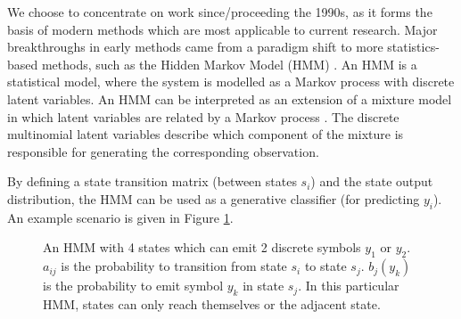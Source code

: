 \documentclass[12pt]{llncs}
\begin{document}
We choose to concentrate on work since/proceeding the 1990s, as it forms the basis of modern methods which are most applicable to current research. Major breakthroughs in early methods came from a paradigm shift to more statistics-based methods, such as the Hidden Markov Model (HMM) \cite{juang2005automatic}. An HMM is a statistical model, where the system is modelled as a Markov process with discrete latent variables. An HMM can be interpreted as an extension of a mixture model in which latent variables are related by a Markov process \cite{bishop2006pattern}. The discrete multinomial latent variables describe which component of the mixture is responsible for generating the corresponding observation.

By defining a state transition matrix (between states $s_i$) and the state output distribution, the HMM can be used as a generative classifier (for predicting $y_i$). An example scenario is given in Figure \ref{fig:HMM}.

\begin{figure}[htbp]
\begin{center}
\end{center}
\caption{An HMM with 4 states which can emit 2 discrete symbols $y_1$ or $y_2$.
$a_{ij}$ is the probability to transition from state $s_i$ to state $s_j$.
$b_j(y_k)$ is the probability to emit symbol $y_k$ in state $s_j$.
In this particular HMM, states can only reach themselves or the adjacent state.}
\label{fig:HMM}
\end{figure}
\end{document}

